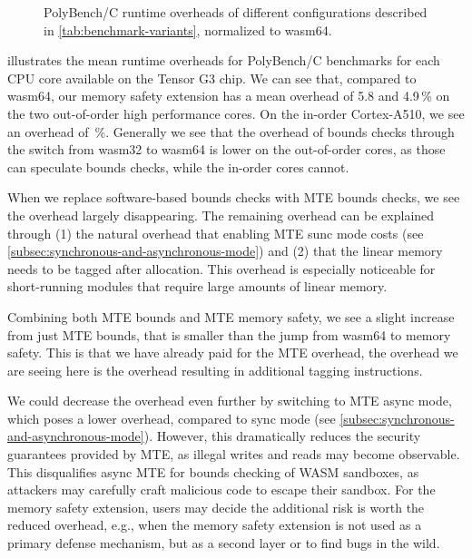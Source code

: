 \begin{figure}[ht]
    \centering
    
    \caption{PolyBench/C runtime overheads of different configurations described in \cref{tab:benchmark-variants}, normalized to wasm64.}
    \label{fig:runtime-overheads-combined}
\end{figure}

 illustrates the mean runtime overheads for PolyBench/C benchmarks for each CPU core available on the Tensor G3 chip.
We can see that, compared to wasm64, our memory safety extension has a mean overhead of 5.8 and 4.9\,\% on the two out-of-order high performance cores.
On the in-order Cortex-A510, we see an overhead of \,\%.
Generally we see that the overhead of bounds checks through the switch from wasm32 to wasm64 is lower on the out-of-order cores, as those can speculate bounds checks, while the in-order cores cannot.

When we replace software-based bounds checks with \ac{MTE} bounds checks, we see the overhead largely disappearing.
The remaining overhead can be explained through (1) the natural overhead that enabling \ac{MTE} sunc mode costs (see \cref{subsec:synchronous-and-asynchronous-mode}) and (2) that the linear memory needs to be tagged after allocation.
This overhead is especially noticeable for short-running modules that require large amounts of linear memory.

Combining both \ac{MTE} bounds and \ac{MTE} memory safety, we see a slight increase from just \ac{MTE} bounds, that is smaller than the jump from wasm64 to memory safety.
This is that we have already paid for the \ac{MTE} overhead, the overhead we are seeing here is the overhead resulting in additional tagging instructions.

We could decrease the overhead even further by switching to \ac{MTE} async mode, which poses a lower overhead, compared to sync mode (see \cref{subsec:synchronous-and-asynchronous-mode}).
However, this dramatically reduces the security guarantees provided by \ac{MTE}, as illegal writes and reads may become observable.
This disqualifies async \ac{MTE} for bounds checking of \ac{WASM} sandboxes, as attackers may carefully craft malicious code to escape their sandbox.
For the memory safety extension, users may decide the additional risk is worth the reduced overhead, e.g., when the memory safety extension is not used as a primary defense mechanism, but as a second layer or to find bugs in the wild.

